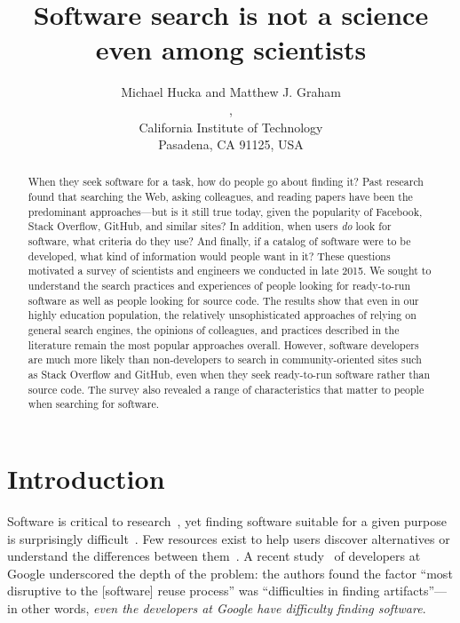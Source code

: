 \documentclass{casicswhitepaper}
\begin{document}
\title{\vspace*{-3ex}Software search is not a science even among scientists}
\date{\vspace*{-1ex}\dateAndVersion}
\author{Michael Hucka and Matthew J. Graham\\
,\quad{}\\
California Institute of Technology\\
Pasadena, CA 91125, USA}
\maketitle

\begin{abstract}
  When they seek software for a task, how do people go about finding it?  Past research found that searching the Web, asking colleagues, and reading papers have been the predominant approaches---but is it still true today, given the popularity of Facebook, Stack Overflow, GitHub, and similar sites?  In addition, when users \emph{do} look for software, what criteria do they use?  And finally, if a catalog of software were to be developed, what kind of information would people want in it?  These questions motivated a survey of scientists and engineers we conducted in late 2015.  We sought to understand the search practices and experiences of people looking for ready-to-run software as well as people looking for source code.  The results show that even in our highly education population, the relatively unsophisticated approaches of relying on general search engines, the opinions of colleagues, and practices described in the literature remain the most popular approaches overall.  However, software developers are much more likely than non-developers to search in community-oriented sites such as Stack Overflow and GitHub, even when they seek ready-to-run software rather than source code.  The survey also revealed a range of characteristics that matter to people when searching for software.
\end{abstract}


\section{Introduction}

Software is critical to research~, yet finding software suitable for a given purpose is surprisingly difficult~\cite{cannata_2005, Bourne::2015, white2014nih}.  Few resources exist to help users discover alternatives or understand the differences between them~\cite{white2014nih}.  A recent study~\cite{bauer2014exploratory} of developers at Google underscored the depth of the problem: the authors found the factor ``most disruptive to the [software] reuse process'' was ``difficulties in finding artifacts''---in other words, \emph{even the developers at Google have difficulty finding software}.
\end{document}
